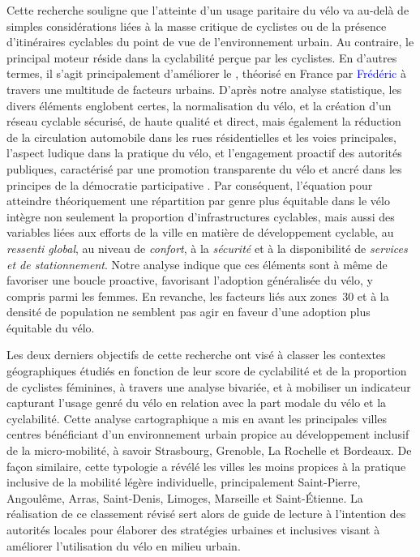 \begin{refsegment}
Cette recherche souligne que l'atteinte d'un usage paritaire du vélo va au-delà de simples considérations liées à la masse critique de cyclistes ou de la présence d'itinéraires cyclables du point de vue de l'environnement urbain. Au contraire, le principal moteur réside dans la cyclabilité perçue par les cyclistes. En d'autres termes, il s'agit principalement d'améliorer le , théorisé en France par \textcolor{blue}{Frédéric} \textcolor{blue}{\textcite[169]{heran_retour_2015}} à travers une multitude de facteurs urbains. D'après notre analyse statistique, les divers éléments englobent certes, la normalisation du vélo, et la création d'un réseau cyclable sécurisé, de haute qualité et direct, mais également la réduction de la circulation automobile dans les rues résidentielles et les voies principales, l'aspect ludique dans la pratique du vélo, et l'engagement proactif des autorités publiques, caractérisé par une promotion transparente du vélo et ancré dans les principes de la démocratie participative \textcolor{blue}{\autocite{heran_systeme_2001}}. Par conséquent, l'équation pour atteindre théoriquement une répartition par genre plus équitable dans le vélo intègre non seulement la proportion d'infrastructures cyclables, mais aussi des variables liées aux efforts de la ville en matière de développement cyclable, au \textsl{ressenti global}, au niveau de \textsl{confort}, à la \textsl{sécurité} et à la disponibilité de \textsl{services et de stationnement}. Notre analyse indique que ces éléments sont à même de favoriser une boucle proactive, favorisant l'adoption généralisée du vélo, y compris parmi les femmes. En revanche, les facteurs liés aux zones~30 et à la densité de population ne semblent pas agir en faveur d'une adoption plus équitable du vélo.%

Les deux derniers objectifs de cette recherche ont visé à classer les contextes géographiques étudiés en fonction de leur score de cyclabilité et de la proportion de cyclistes féminines, à travers une analyse bivariée, et à mobiliser un indicateur capturant l'usage genré du vélo en relation avec la part modale du vélo et la cyclabilité. Cette analyse cartographique a mis en avant les principales villes centres bénéficiant d'un environnement urbain propice au développement inclusif de la micro-mobilité, à savoir Strasbourg, Grenoble, La Rochelle et Bordeaux. De façon similaire, cette typologie a révélé les villes les moins propices à la pratique inclusive de la mobilité légère individuelle, principalement Saint-Pierre, Angoulême, Arras, Saint-Denis, Limoges, Marseille et Saint-Étienne. La réalisation de ce classement révisé sert alors de guide de lecture à l'intention des autorités locales pour élaborer des stratégies urbaines et inclusives visant à améliorer l'utilisation du vélo en milieu urbain.%


\end{refsegment}
